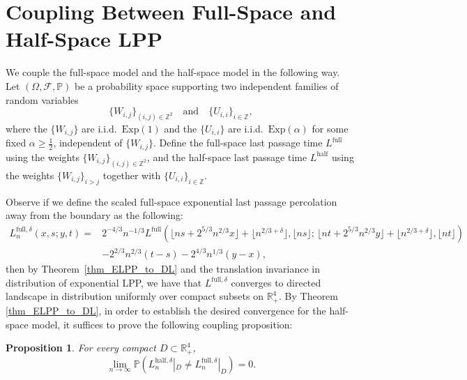 \documentclass[11pt]{article}
\newtheorem{proposition}[theorem]{Proposition}
\theoremstyle{definition}
\newcommand{\R}{\mathbb{R}}
\newcommand{\Z}{\mathbb{Z}}
\newcommand{\Prob}{\mathbb{P}}
\newcommand{\Lfull}{L^{\mathrm{full}}}
\begin{document}
\section{Coupling Between Full-Space and Half-Space LPP}
\label{sec:coupling}

We couple the full-space model and the half-space model in the following way.  
Let $(\Omega,\mathcal{F},\Prob)$ be a probability space supporting two independent families of random variables
\[
\{W_{i,j}\}_{(i,j)\in\Z^2}\quad\text{and}\quad \{U_{i,i}\}_{i\in\Z},
\]
where the $\{W_{i,j}\}$ are i.i.d.\ $\mathrm{Exp}(1)$ and the $\{U_{i,i}\}$ are i.i.d.\ $\mathrm{Exp}(\alpha)$ for some fixed $\alpha \geq \frac{1}{2}$, independent of $\{W_{i,j}\}$.  
Define the full-space last passage time $L^{\mathrm{full}}$ using the weights $\{W_{i,j}\}_{(i,j)\in\Z^2}$, and the half-space last passage time $L^{\mathrm{half}}$ using the weights $\{W_{i,j}\}_{i>j}$ together with $\{U_{i,i}\}_{i\in\Z}$.  

Observe if we define the scaled full-space exponential last passage percolation away from the boundary as the following:
\begin{equation}\label{eq:Lfullk_def}
\begin{split}
L^{\mathrm{full},\delta}_n(x,s;y,t)
=&2^{-4/3}n^{-1/3}\Lfull(\lfloor ns+2^{5/3}n^{2/3}x\rfloor +\lfloor n^{2/3+\delta} \rfloor,\lfloor ns\rfloor;\,
                 \lfloor nt+2^{5/3}n^{2/3}y\rfloor+\lfloor n^{2/3+\delta} \rfloor,\lfloor nt\rfloor)\\
                 &
          -2^{2/3}n^{2/3}(t-s)-2^{4/3}n^{1/3}(y-x),
\end{split}
\end{equation}
then by Theorem~\ref{thm_ELPP_to_DL} and the translation invariance in distribution of exponential LPP, we have that $L^{\mathrm{full},\delta}$ converges to directed landscape in distribution uniformly over compact subsets on $\R_+^4$. By Theorem \ref{thm_ELPP_to_DL}, in order to establish the desired convergence for the half-space model, it suffices to prove the following coupling proposition:

\begin{proposition}\label{prop:diff}
For every compact $D\subset\R_+^4$,
\begin{equation}\label{eq:key_prob}
\lim_{n \rightarrow \infty}\Prob\!\left(L^{\mathrm{half},\delta}_n|_D \neq L^{\mathrm{full},\delta}_n|_D
  \right)= 0.
\end{equation}
\end{proposition}
\end{document}
